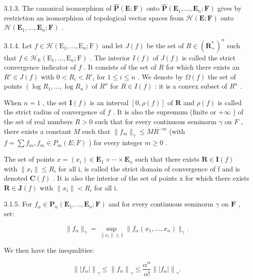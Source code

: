 3.1.3. The canonical isomorphism of \(\hat{\mathbf{P}}(\mathbf{E};\mathbf{F})\) onto \(\hat{\mathbf{P}}(\mathbf{E}_{1},\ldots,\mathbf{E}_{n};\mathbf{F})\) gives by restriction an isomorphism of topological vector spaces from \(\mathcal{H}(\mathbf{E};\mathbf{F})\) onto \(\mathcal{H}(\mathbf{E}_{1},\ldots,\mathbf{E}_{n};\mathbf{F})\) .

3.1.4. Let \(f \in \mathcal{H}(\mathrm{E}_1, \ldots, \mathrm{E}_n; \mathrm{F})\) and let \(J(f)\) be the set of \(R \in (\mathbf{R}_+^*)^n\) such that \(f \in \mathcal{H}_{\mathbb{R}}(\mathrm{E}_1, \ldots, \mathrm{E}_n; \mathrm{F})\) . The interior \(I(f)\) of \(J(f)\) is called the strict convergence indicator of \(f\) . It consists of the set of \(R\) for which there exists an \(R' \in J(f)\) with \(0 < R_i < R'_i\) for \(1 \leqslant i \leqslant n\) . We denote by \(\Omega(f)\) the set of points \((\log R_1, \ldots, \log R_n)\) of \(R^n\) for \(R \in I(f)\) : it is a convex subset of \(R^n\) .

When \(n=1\) , the set \(\mathbf{I}(f)\) is an interval \([0,\rho(f)]\) of \(\mathbf{R}\) and \(\rho(f)\) is called the strict radius of convergence of \(f\) . It is also the supremum (finite or \(+\infty\) ) of the set of real numbers \(R>0\) such that for every continuous seminorm \(\gamma\) on \(F\) , there exists a constant \(M\) such that \(\|f_{m}\|_{\gamma}\leqslant MR^{-m}\) (with \(f=\sum f_{m},f_{m}\in P_{m}(E;F)\) ) for every integer \(m\geqslant0\) .

The set of points \(x = (x_i) \in \mathbf{E}_1 \times \cdots \times \mathbf{E}_n\) such that there exists \(\mathbf{R} \in \mathbf{I}(f)\) with \(\|x_i\| \leqslant R_i\) for all i, is called the strict domain of convergence of f and is denoted \(\mathbf{C}(f)\) . It is also the interior of the set of points x for which there exists \(\mathbf{R} \in \mathbf{J}(f)\) with \(\|x_i\| < R_i\) for all i.

3.1.5. For \(f_{\alpha} \in \mathbf{P}_{\alpha}(\mathbf{E}_1, \ldots, \mathbf{E}_n; \mathbf{F})\) and for every continuous seminorm \(\gamma\) on \(\mathbf{F}\) , set:

\[
\| f _ {\alpha} \| _ {\gamma} = \sup _ {\| x _ {i} \| \leqslant 1} \| f _ {\alpha} (x _ {1}, \dots , x _ {n}) \| _ {\gamma}.
\]

We then have the inequalities:

\[
\left\| \left| f _ {\alpha} \right| \right\| _ {\gamma} \leqslant \left\| f _ {\alpha} \right\| _ {\gamma} \leqslant \frac {\alpha^ {\alpha}}{\alpha !} \left\| \left| f _ {\alpha} \right| \right\| _ {\gamma}.
\]

